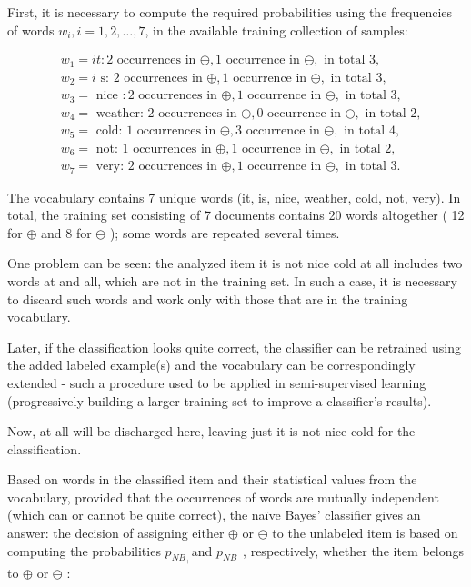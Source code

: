 \documentclass[10pt]{book}
\begin{document}
First, it is necessary to compute the required probabilities using the frequencies of words $w_{i}, i=1,2, \ldots, 7$, in the available training collection of samples:

$$
\begin{aligned}
& w_{1}=i t: 2 \text { occurrences in } \oplus, 1 \text { occurrence in } \ominus, \text { in total } 3, \\
& w_{2}=i \text { s: } 2 \text { occurrences in } \oplus, 1 \text { occurrence in } \ominus, \text { in total } 3, \\
& w_{3}=\text { nice }: 2 \text { occurrences in } \oplus, 1 \text { occurrence in } \ominus, \text { in total } 3, \\
& w_{4}=\text { weather: } 2 \text { occurrences in } \oplus, 0 \text { occurrence in } \ominus, \text { in total } 2, \\
& w_{5}=\text { cold: } 1 \text { occurrences in } \oplus, 3 \text { occurrence in } \ominus, \text { in total } 4, \\
& w_{6}=\text { not: } 1 \text { occurrences in } \oplus, 1 \text { occurrence in } \ominus, \text { in total } 2, \\
& w_{7}=\text { very: } 2 \text { occurrences in } \oplus, 1 \text { occurrence in } \ominus, \text { in total } 3 .
\end{aligned}
$$

The vocabulary contains 7 unique words (it, is, nice, weather, cold, not, very). In total, the training set consisting of 7 documents contains 20 words altogether ( 12 for $\oplus$ and 8 for $\ominus$ ); some words are repeated several times.

One problem can be seen: the analyzed item it is not nice cold at all includes two words at and all, which are not in the training set. In such a case, it is necessary to discard such words and work only with those that are in the training vocabulary.

Later, if the classification looks quite correct, the classifier can be retrained using the added labeled example(s) and the vocabulary can be correspondingly extended - such a procedure used to be applied in semi-supervised learning (progressively building a larger training set to improve a classifier's results).

Now, at all will be discharged here, leaving just it is not nice cold for the classification.

Based on words in the classified item and their statistical values from the vocabulary, provided that the occurrences of words are mutually independent (which can or cannot be quite correct), the naïve Bayes' classifier gives an answer: the decision of assigning either $\oplus$ or $\ominus$ to the unlabeled item is based on computing the probabilities $p_{N B_{+}}$and $p_{N B_{-}}$, respectively, whether the item belongs to $\oplus$ or $\ominus$ :
\end{document}
